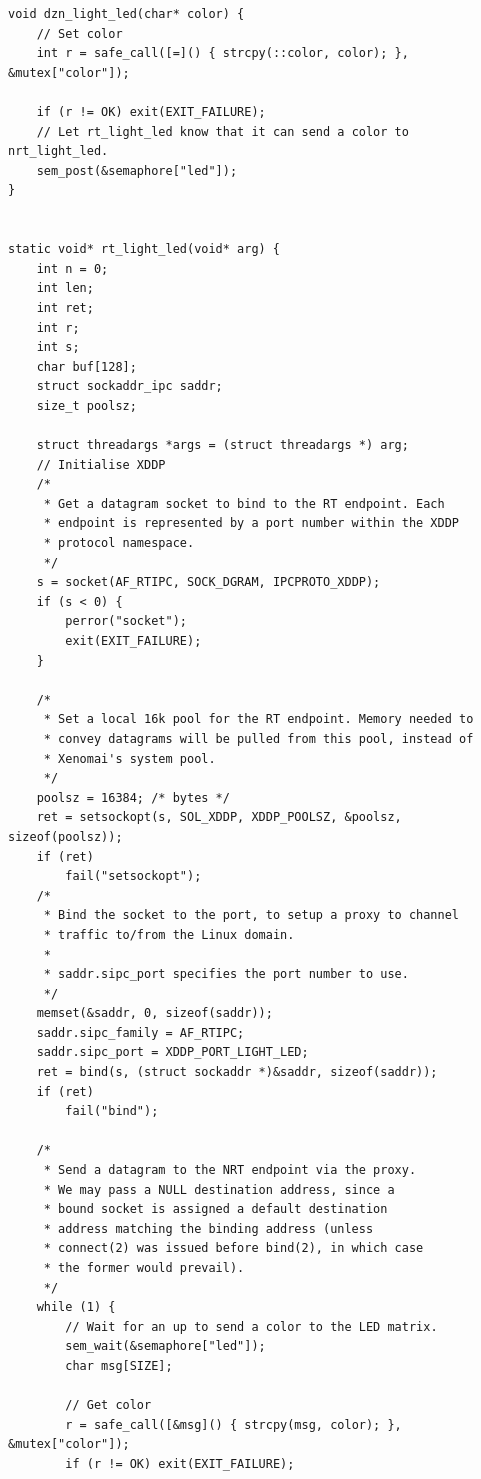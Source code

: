 \documentclass[12pt]{scrreprt}
\begin{document}
\begin{appendices}
\begin{verbatim}
void dzn_light_led(char* color) {
    // Set color
    int r = safe_call([=]() { strcpy(::color, color); }, &mutex["color"]);

    if (r != OK) exit(EXIT_FAILURE);
    // Let rt_light_led know that it can send a color to nrt_light_led.
    sem_post(&semaphore["led"]);
}


static void* rt_light_led(void* arg) {
    int n = 0;
    int len;
    int ret;
    int r;
    int s;
    char buf[128];
    struct sockaddr_ipc saddr;
    size_t poolsz;

    struct threadargs *args = (struct threadargs *) arg;
    // Initialise XDDP
    /*
     * Get a datagram socket to bind to the RT endpoint. Each
     * endpoint is represented by a port number within the XDDP
     * protocol namespace.
     */
    s = socket(AF_RTIPC, SOCK_DGRAM, IPCPROTO_XDDP);
    if (s < 0) {
        perror("socket");
        exit(EXIT_FAILURE);
    }

    /*
     * Set a local 16k pool for the RT endpoint. Memory needed to
     * convey datagrams will be pulled from this pool, instead of
     * Xenomai's system pool.
     */
    poolsz = 16384; /* bytes */
    ret = setsockopt(s, SOL_XDDP, XDDP_POOLSZ, &poolsz, sizeof(poolsz));
    if (ret)
        fail("setsockopt");
    /*
     * Bind the socket to the port, to setup a proxy to channel
     * traffic to/from the Linux domain.
     *
     * saddr.sipc_port specifies the port number to use.
     */
    memset(&saddr, 0, sizeof(saddr));
    saddr.sipc_family = AF_RTIPC;
    saddr.sipc_port = XDDP_PORT_LIGHT_LED;
    ret = bind(s, (struct sockaddr *)&saddr, sizeof(saddr));
    if (ret)
        fail("bind");

    /*
     * Send a datagram to the NRT endpoint via the proxy.
     * We may pass a NULL destination address, since a
     * bound socket is assigned a default destination
     * address matching the binding address (unless
     * connect(2) was issued before bind(2), in which case
     * the former would prevail).
     */
    while (1) {
        // Wait for an up to send a color to the LED matrix.
        sem_wait(&semaphore["led"]); 
        char msg[SIZE];

        // Get color
        r = safe_call([&msg]() { strcpy(msg, color); }, &mutex["color"]);
        if (r != OK) exit(EXIT_FAILURE);


\end{verbatim}
\end{appendices}
\end{document}
